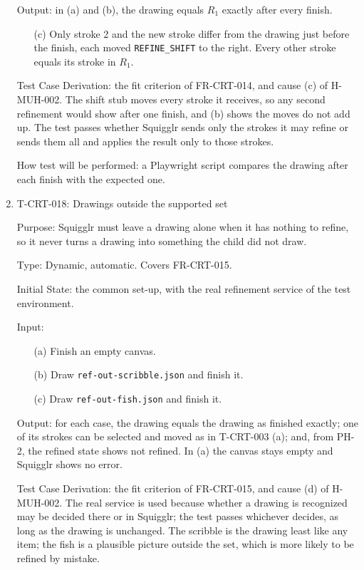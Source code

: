 \documentclass[12pt, titlepage]{article}
\newcommand{\testitem}[1]{\item #1\par\nopagebreak}
\begin{document}
\begin{enumerate}
Output: in (a) and (b), the drawing equals $R_1$ exactly after every finish.
\begin{itemize}
\item[(c)] Only stroke 2 and the new stroke differ from the drawing just
before the finish, each moved \texttt{REFINE\_SHIFT} to the right. Every
other stroke equals its stroke in $R_1$.
\end{itemize}

Test Case Derivation: the fit criterion of FR-CRT-014, and cause (c) of
H-MUH-002. The shift stub moves every stroke it receives, so any second
refinement would show after one finish, and (b) shows the moves do not add
up. The test passes whether Squigglr sends only the strokes it may refine or
sends them all and applies the result only to those strokes.

How test will be performed: a Playwright script compares the drawing after
each finish with the expected one.

\testitem{T-CRT-018: Drawings outside the supported set}

Purpose: Squigglr must leave a drawing alone when it has nothing to refine,
so it never turns a drawing into something the child did not draw.

Type: Dynamic, automatic. Covers FR-CRT-015.

Initial State: the common set-up, with the real refinement service of the
test environment.

Input:
\begin{itemize}
\item[(a)] Finish an empty canvas.
\item[(b)] Draw \texttt{ref-\allowbreak{}out-\allowbreak{}scribble.json} and
finish it.
\item[(c)] Draw \texttt{ref-\allowbreak{}out-\allowbreak{}fish.json} and
finish it.
\end{itemize}

Output: for each case, the drawing equals the drawing as finished exactly;
one of its strokes can be selected and moved as in T-CRT-003 (a); and, from
PH-2, the refined state shows not refined. In (a) the canvas stays empty and
Squigglr shows no error.

Test Case Derivation: the fit criterion of FR-CRT-015, and cause (d) of
H-MUH-002. The real service is used because whether a drawing is recognized
may be decided there or in Squigglr; the test passes whichever decides, as
long as the drawing is unchanged. The scribble is the drawing least like any
item; the fish is a plausible picture outside the set, which is more likely
to be refined by mistake.


\end{enumerate}
\end{document}

